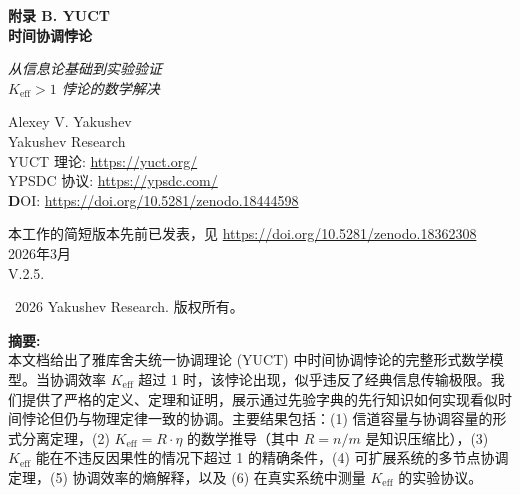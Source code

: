 \documentclass[12pt]{article}
\begin{document}
	\begin{titlepage}
		\begin{center}
			\vspace*{0cm}
			\Huge\textbf{附录 B. YUCT\\
				时间协调悖论}
			
			\vspace{0cm}
			\LARGE\textit{从信息论基础到实验验证 \\
				$K_{\text{eff}} > 1$ 悖论的数学解决}
			
			\vspace{1cm}
			\Large
			Alexey V. Yakushev\\
			Yakushev Research\\
			YUCT 理论: \url{https://yuct.org/}\\
			YPSDC 协议: \url{https://ypsdc.com/}\\
			
			\vspace{2cm}
			\textbf DOI: \url{https://doi.org/10.5281/zenodo.18444598}\\
			
			\vspace{1cm}
			
			\vspace{0cm}
			\large 
			本工作的简短版本先前已发表，见 \url{https://doi.org/10.5281/zenodo.18362308}\\
			\vspace{1cm}
			2026年3月 \\ \large V.2.5.
			
			\vspace{5cm}
			\textcopyright~2026 Yakushev Research. 版权所有。
			
			\newpage
			\vfill
			\normalsize
			\begin{minipage}{0.8\textwidth}
				\centering
				\textbf{摘要:} \\ 本文档给出了雅库舍夫统一协调理论 (YUCT) 中时间协调悖论的完整形式数学模型。当协调效率 $K_{\text{eff}}$ 超过 1 时，该悖论出现，似乎违反了经典信息传输极限。我们提供了严格的定义、定理和证明，展示通过先验字典的先行知识如何实现看似时间悖论但仍与物理定律一致的协调。主要结果包括：(1) 信道容量与协调容量的形式分离定理，(2) $K_{\text{eff}} = R \cdot \eta$ 的数学推导（其中 $R = n/m$ 是知识压缩比），(3) $K_{\text{eff}}$ 能在不违反因果性的情况下超过 1 的精确条件，(4) 可扩展系统的多节点协调定理，(5) 协调效率的熵解释，以及 (6) 在真实系统中测量 $K_{\text{eff}}$ 的实验协议。
			\end{minipage}
			

\end{center}
\end{titlepage}
\end{document}

